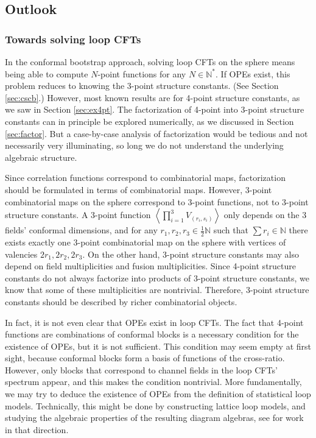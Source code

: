 \documentclass[12pt, a4paper]{article}
\begin{document}
\subsection{Outlook}

\subsubsection{Towards solving loop CFTs}

In the conformal bootstrap approach, solving loop CFTs on the sphere means being able to compute $N$-point functions for any $N\in \mathbb{N}^*$. If OPEs exist, this problem reduces to knowing the 3-point structure constants. (See Section \ref{sec:cscb}.) However, most known results are for 4-point structure constants, as we saw in Section \ref{sec:ex4pt}. The factorization of 4-point into 3-point structure constants can in principle be explored numerically, as we discussed in Section \ref{sec:factor}. But a case-by-case analysis of factorization would be tedious and not necessarily very illuminating, so long we do not understand the underlying algebraic structure. 

Since correlation functions correspond to combinatorial maps, factorization should be formulated in terms of combinatorial maps. However, 3-point combinatorial maps on the sphere correspond to 3-point functions, not to 3-point structure constants. A 3-point function $\left<\prod_{i=1}^3 V_{(r_i,s_i)}\right>$ only depends on the 3 fields' conformal dimensions, and for any $r_1,r_2,r_3\in \frac12\mathbb{N}$ such that $\sum r_i\in\mathbb{N}$ there exists exactly one 3-point combinatorial map on the sphere with vertices of valencies $2r_1,2r_2,2r_3$.
On the other hand, 3-point structure constants may also depend on field multiplicities and fusion multiplicities. Since 4-point structure constants do not always factorize into products of 3-point structure constants, we know that some of these multiplicities are nontrivial. Therefore, 3-point structure constants should be described by richer combinatorial objects. 

In fact, it is not even clear that OPEs exist in loop CFTs. The fact that 4-point functions are combinations of conformal blocks is a necessary condition for the existence of OPEs, but it is not sufficient. This condition may seem empty at first sight, because conformal blocks form a basis of functions of the cross-ratio. However, only blocks that correspond to channel fields in the loop CFTs' spectrum appear, and this makes the condition nontrivial. More fundamentally, we may try to deduce the existence of OPEs from the definition of statistical loop models. Technically, this might be done by constructing lattice loop models, and studying the algebraic properties of the resulting diagram algebras, see \cite{im23} for work in that direction.    
\end{document}
